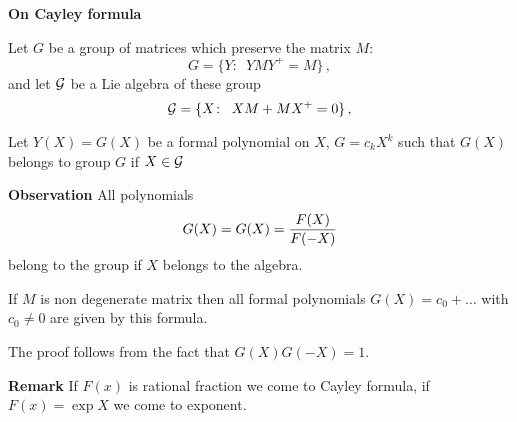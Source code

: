 \def\p{\partial}
\def\t {\tilde}
\def \m {\medskip}
\def\degree {{\bf {\rm degree}\,\,}}
\def \finish {${\,\,\vrule height1mm depth2mm width 8pt}$}





\def\a {\alpha}
\def\vare{{\varepsilon}}
\def\l {\lambda}
\def\s {{\sigma}}

\def\G {{\Gamma}}

\def\A {{\bf A}}
\def\C {{\bf C}}
\def\E  {{\bf E}}
\def\K {{\bf K}}
\def\N {{\bf N}}
\def\Q {{\bf Q}}
\def\R  {{\bf R}}
\def\V {{\cal V}}
\def \X   {{\bf X}}
\def \Y   {{\bf Y}}
\def\Z {{\bf Z}}



\def\ac {{\bf a}}
\def\e{{\bf e}}
\def\f {{\bf f}}
\def\n {{\bf n}}
\def\r {{\bf r}}
\def\v {{\bf v}}
\def \x   {{\bf x}}
\def \y   {{\bf y}}


\def\pt {{\bf pt}}


\centerline {\bf On Cayley formula}


\medskip


 Let $G$ be a group  of matrices which preserve the matrix $M$:
             $$
         G=\{Y\colon \,\,\, YMY^+=M\}\,,
             $$
and let $\cal G$ be  a Lie algebra of these group
       $$
    {\cal G}=\{X\colon \,\,\, XM+MX^+=0\}\,,
       $$

Let $Y(X)=G(X)$ be a formal polynomial on $X$, $G=c_kX^k$ such that
               $G(X)$ belongs to group $G$ if $X\in \cal G$



{\bf Observation}  All polynomials
      $$
  G(X)=G(X)={F(X)\over F(-X)}
      $$
belong to the group if $X$ belongs to the algebra.


 If $M$ is non degenerate matrix then all formal
polynomials $G(X)=c_0+\dots$ with $c_0\not=0$ are given by this
formula.

\medskip
 The proof follows from the fact that
  $G(X)G(-X)=1$.


{\bf Remark} If $F(x)$ is rational fraction we come to Cayley
formula, if $F(x)=\exp X$ we come to exponent.

 \bye
